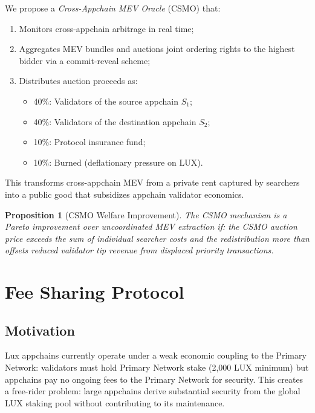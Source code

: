 \documentclass[11pt]{article}
\newtheorem{proposition}[theorem]{Proposition}
\begin{document}
We propose a \emph{Cross-Appchain MEV Oracle} (CSMO) that:
\begin{enumerate}[leftmargin=1.5em]
  \item Monitors cross-appchain arbitrage in real time;
  \item Aggregates MEV bundles and auctions joint ordering rights to the highest bidder
    via a commit-reveal scheme;
  \item Distributes auction proceeds as:
    \begin{itemize}
      \item 40\%: Validators of the source appchain $S_1$;
      \item 40\%: Validators of the destination appchain $S_2$;
      \item 10\%: Protocol insurance fund;
      \item 10\%: Burned (deflationary pressure on LUX).
    \end{itemize}
\end{enumerate}

This transforms cross-appchain MEV from a private rent captured by searchers into a
public good that subsidizes appchain validator economics.

\begin{proposition}[CSMO Welfare Improvement]
The CSMO mechanism is a Pareto improvement over uncoordinated MEV extraction if:
the CSMO auction price exceeds the sum of individual searcher costs and the redistribution
more than offsets reduced validator tip revenue from displaced priority transactions.
\end{proposition}

\section{Fee Sharing Protocol}
\label{sec:feesharing}

\subsection{Motivation}

Lux appchains currently operate under a weak economic coupling to the Primary Network:
validators must hold Primary Network stake (2,000 LUX minimum) but appchains pay no
ongoing fees to the Primary Network for security. This creates a free-rider problem:
large appchains derive substantial security from the global LUX staking pool without
contributing to its maintenance.
\end{document}
